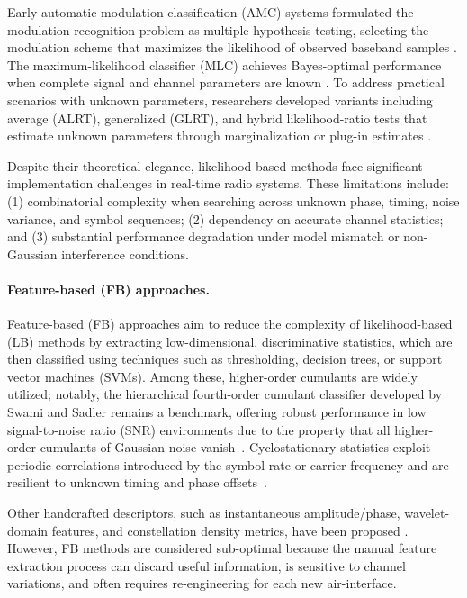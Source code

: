 Early automatic modulation classification (AMC) systems formulated the modulation recognition problem as multiple-hypothesis testing, selecting the modulation scheme that maximizes the likelihood of observed baseband samples \cite{wei2000, dobre2007}. The maximum-likelihood classifier (MLC) achieves Bayes-optimal performance when complete signal and channel parameters are known \cite{wei2000}. To address practical scenarios with unknown parameters, researchers developed variants including average (ALRT), generalized (GLRT), and hybrid likelihood-ratio tests that estimate unknown parameters through marginalization or plug-in estimates \cite{dobre2007}.

Despite their theoretical elegance, likelihood-based methods face significant implementation challenges in real-time radio systems. These limitations include: (1) combinatorial complexity when searching across unknown phase, timing, noise variance, and symbol sequences; (2) dependency on accurate channel statistics; and (3) substantial performance degradation under model mismatch or non-Gaussian interference conditions.

\paragraph{Feature-based (FB) approaches.}

Feature-based (FB) approaches aim to reduce the complexity of likelihood-based (LB) methods by extracting low-dimensional, discriminative statistics, which are then classified using techniques such as thresholding, decision trees, or support vector machines (SVMs). Among these, higher-order cumulants are widely utilized; notably, the hierarchical fourth-order cumulant classifier developed by Swami and Sadler remains a benchmark, offering robust performance in low signal-to-noise ratio (SNR) environments due to the property that all higher-order cumulants of Gaussian noise vanish~\cite{swami2000hierarchical}. Cyclostationary statistics exploit periodic correlations introduced by the symbol rate or carrier frequency and are resilient to unknown timing and phase offsets~\cite{gardner1994}.

Other handcrafted descriptors, such as instantaneous amplitude/phase, wavelet-domain features, and constellation density metrics, have been proposed \cite{6487244, al2019performance}. However, FB methods are considered sub-optimal because the manual feature extraction process can discard useful information, is sensitive to channel variations, and often requires re-engineering for each new air-interface.

